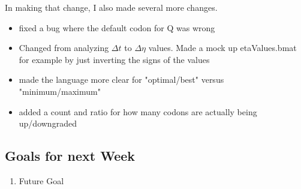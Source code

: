 \documentclass[11pt]{article} %
\begin{document}
In making that change, I also made several more changes.

\begin{itemize}
\item fixed a bug where the default codon for Q was wrong
\item Changed from analyzing $\Delta t$ to $\Delta\eta$ values. Made a mock up etaValues.bmat for example by just inverting the signs of the values
\item made the language more clear for "optimal/best" versus "minimum/maximum"
\item added a count and ratio for how many codons are actually being up/downgraded
\end{itemize}



\subsection{Goals for next Week}
\begin{enumerate}
\item Future Goal
\end{enumerate}
\end{document}
